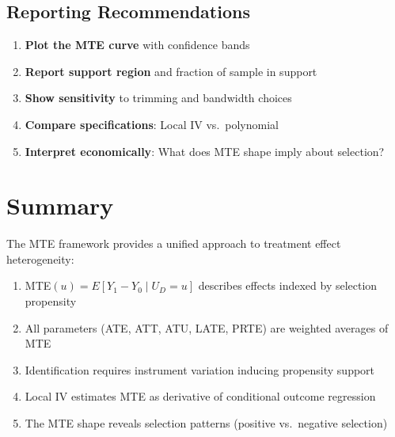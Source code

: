 \subsection{Reporting Recommendations}

\begin{enumerate}
\item \textbf{Plot the MTE curve} with confidence bands
\item \textbf{Report support region} and fraction of sample in support
\item \textbf{Show sensitivity} to trimming and bandwidth choices
\item \textbf{Compare specifications}: Local IV vs.\ polynomial
\item \textbf{Interpret economically}: What does MTE shape imply about selection?
\end{enumerate}

\section{Summary}
\label{sec:mte-summary}

The MTE framework provides a unified approach to treatment effect heterogeneity:

\begin{enumerate}
\item MTE$(u) = E[Y_1 - Y_0 \mid U_D = u]$ describes effects indexed by selection propensity
\item All parameters (ATE, ATT, ATU, LATE, PRTE) are weighted averages of MTE
\item Identification requires instrument variation inducing propensity support
\item Local IV estimates MTE as derivative of conditional outcome regression
\item The MTE shape reveals selection patterns (positive vs.\ negative selection)
\end{enumerate}

